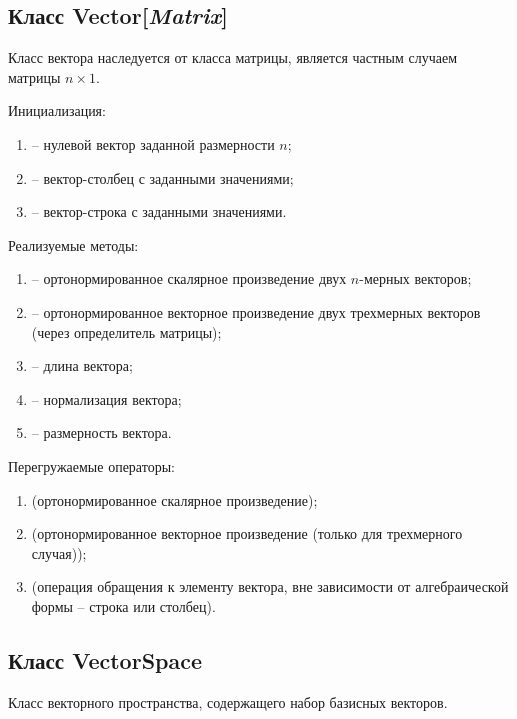 \subsection{Класс Vector[\textit{Matrix}]}
	\noindent Класс вектора наследуется от класса матрицы, является частным случаем матрицы $n \times 1$.

	\noindent Инициализация:
	\begin{enumerate}
		\item {} -- нулевой вектор заданной размерности \( n \);
		\item {} -- вектор-столбец с заданными значениями;
		\item {} -- вектор-строка с заданными значениями.
	\end{enumerate}

	\noindent Реализуемые методы:
	\begin{enumerate}
		\item {} -- ортонормированное скалярное произведение двух $n$-мерных векторов;
		\item {} -- ортонормированное векторное произведение двух трехмерных векторов (через определитель матрицы);
		\item {} -- длина вектора;
		\item {} -- нормализация вектора;
		\item {} -- размерность вектора.
	\end{enumerate}

	\noindent Перегружаемые операторы:
	\begin{enumerate}
		\item {} (ортонормированное скалярное произведение);
		\item {} (ортонормированное векторное произведение (только для трехмерного случая));
		\item {} (операция обращения к элементу вектора, вне зависимости от алгебраической формы -- строка или столбец).
	\end{enumerate}


\subsection{Класс VectorSpace}
	\noindent Класс векторного пространства, содержащего набор базисных векторов.

